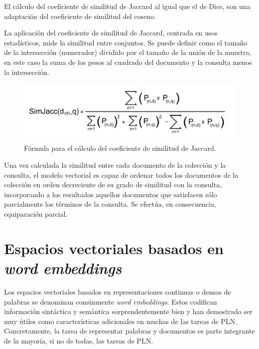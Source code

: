 \documentclass[titlepage]{article}
\begin{document}
El cálculo del coeficiente de similitud de Jaccard\cite{jaccard} al igual que el de Dice\cite{dice}, son una adaptación del coeficiente de similitud del coseno. 

La aplicación del coeficiente de similitud de Jaccard, centrada en usos estadísticos, mide la similitud entre conjuntos. Se puede definir como el tamaño de la intersección (numerador) dividido por el tamaño de la unión de la muestra, en este caso la suma de los pesos al cuadrado del documento y la consulta menos la intersección.

\begin{figure}[h]
	\begin{center}
		\includegraphics*[scale=0.5]{similitud_jaccard.png}
	\end{center}
	\caption{Fórmula para el cálculo del coeficiente de similitud de Jaccard.}
	\label{fig: Figure 5}
\end{figure}

\newpage

Una vez calculada la similitud entre cada documento de la colección y la consulta, el modelo vectorial es capaz de ordenar todos los documentos de la colección en orden decreciente de su grado de similitud con la consulta, incorporando a los resultados aquellos documentos que satisfacen sólo parcialmente los términos de la consulta. Se efectúa, en consecuencia, equiparación parcial.

\section{Espacios vectoriales basados en \textit{word embeddings}}\label{espacios}

Los espacios vectoriales basados en representaciones continuas o densas de palabras se denominan comúnmente \textit{word embeddings}\cite{wordembeddings}. Estos codifican información sintáctica y semántica sorprendentemente bien y han demostrado ser muy útiles como características adicionales en muchas de las tareas de PLN.  Concretamente, la tarea de representar palabras y documentos es parte integrante de la mayoría, si no de todas, las tareas de PLN. 
\end{document}
